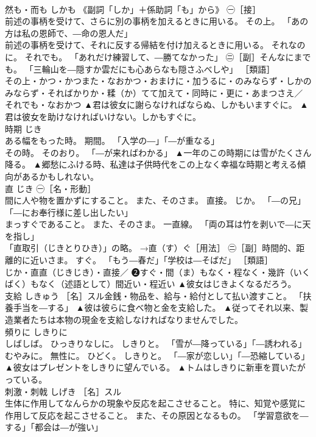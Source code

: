\documentclass[8pt]{extreport}
\begin{document}
\begin{CJK}{UTF8}{min}
\\	然も・而も	しかも	《副詞「しか」＋係助詞「も」から》 ㊀［接］ 
\\	前述の事柄を受けて、さらに別の事柄を加えるときに用いる。 その上。 「あの方は私の恩師で、―命の恩人だ」 
\\	前述の事柄を受けて、それに反する帰結を付け加えるときに用いる。 それなのに。 それでも。 「あれだけ練習して、―勝てなかった」 ㊁［副］そんなにまでも。 「三輪山を―隠すか雲だにも心あらなも隠さふべしや」 ［類語］ 
\\	その上・かつ・かつまた・なおかつ・おまけに・加うるに・のみならず・しかのみならず・そればかりか・糅（か）てて加えて・同時に・更に・あまつさえ／
\\	それでも・なおかつ	▲君は彼女に謝らなければならぬ、しかもいますぐに。 ▲君は彼女を助けなければいけない。しかもすぐに。
\\	時期	じき	
\\	ある幅をもった時。 期間。 「入学の―」「―が重なる」 
\\	その時。 そのおり。 「―が来ればわかる」	▲一年のこの時期には雪がたくさん降る。 ▲郷愁にふける時、私達は子供時代をこの上なく幸福な時期と考える傾向があるかもしれない。
\\	直	じき	㊀［名・形動］ 
\\	間に人や物を置かずにすること。 また、そのさま。 直接。 じか。 「―の兄」「―にお奉行様に差し出したい」 
\\	まっすぐであること。 また、そのさま。 一直線。 「両の耳は竹を剥いで―に天を指し」 
\\	「直取引（じきとりひき）」の略。 →直（す）ぐ［用法］ ㊁［副］時間的、距離的に近いさま。 すぐ。 「もう―春だ」「学校は―そばだ」 ［類語］ 
\\	じか・直直（じきじき）・直接／ ❷すぐ・間（ま）もなく・程なく・幾許（いくばく）もなく（述語として）間近い・程近い	▲彼女はじきよくなるだろう。
\\	支給	しきゅう	［名］スル金銭・物品を、給与・給付として払い渡すこと。 「扶養手当を―する」	▲彼は彼らに食べ物と金を支給した。 ▲従ってそれ以来、製造業者たちは本物の現金を支給しなければなりませんでした。
\\	頻りに	しきりに	
\\	しばしば。 ひっきりなしに。 しきりと。 「雪が―降っている」「―誘われる」 
\\	むやみに。 無性に。 ひどく。 しきりと。 「―家が恋しい」「―恐縮している」	▲彼女はプレゼントをしきりに望んでいる。 ▲トムはしきりに新車を買いたがっている。
\\	刺激・刺戟	しげき	［名］スル 
\\	生体に作用してなんらかの現象や反応を起こさせること。 特に、知覚や感覚に作用して反応を起こさせること。 また、その原因となるもの。 「学習意欲を―する」「都会は―が強い」 

\end{CJK}
\end{document}
